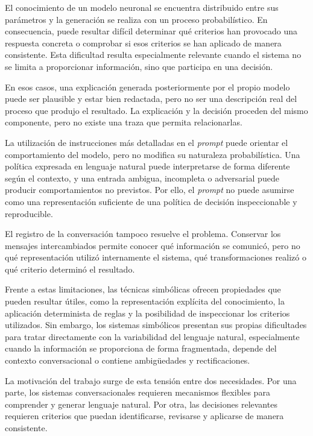 \documentclass[12pt,a4paper]{report}
\begin{document}
El conocimiento de un modelo neuronal se encuentra distribuido entre sus parámetros y la generación se realiza con un proceso probabilístico. En consecuencia, puede resultar difícil determinar qué criterios han provocado una respuesta concreta o comprobar si esos criterios se han aplicado de manera consistente. Esta dificultad resulta especialmente relevante cuando el sistema no se limita a proporcionar información, sino que participa en una decisión.

En esos casos, una explicación generada posteriormente por el propio modelo puede ser plausible y estar bien redactada, pero no ser una descripción real del proceso que produjo el resultado. La explicación y la decisión proceden del mismo componente, pero no existe una traza que permita relacionarlas.

La utilización de instrucciones más detalladas en el \textit{prompt} puede orientar el comportamiento del modelo, pero no modifica su naturaleza probabilística. Una política expresada en lenguaje natural puede interpretarse de forma diferente según el contexto, y una entrada ambigua, incompleta o adversarial puede producir comportamientos no previstos. Por ello, el \textit{prompt} no puede asumirse como una representación suficiente de una política de decisión inspeccionable y reproducible.

El registro de la conversación tampoco resuelve el problema. Conservar los mensajes intercambiados permite conocer qué información se comunicó, pero no qué representación utilizó internamente el sistema, qué transformaciones realizó o qué criterio determinó el resultado.

Frente a estas limitaciones, las técnicas simbólicas ofrecen propiedades que pueden resultar útiles, como la representación explícita del conocimiento, la aplicación determinista de reglas y la posibilidad de inspeccionar los criterios utilizados. Sin embargo, los sistemas simbólicos presentan sus propias dificultades para tratar directamente con la variabilidad del lenguaje natural, especialmente cuando la información se proporciona de forma fragmentada, depende del contexto conversacional o contiene ambigüedades y rectificaciones.

La motivación del trabajo surge de esta tensión entre dos necesidades. Por una parte, los sistemas conversacionales requieren mecanismos flexibles para comprender y generar lenguaje natural. Por otra, las decisiones relevantes requieren criterios que puedan identificarse, revisarse y aplicarse de manera consistente.
\end{document}
